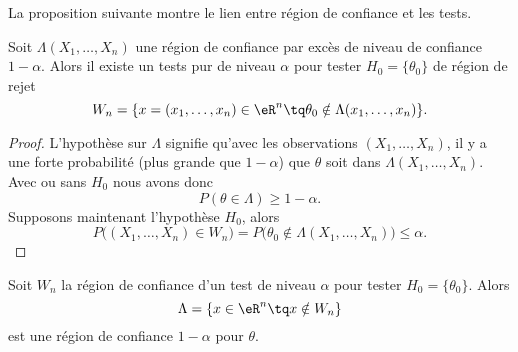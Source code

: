 La proposition suivante montre le lien entre région de confiance et les tests.
\begin{proposition}
    Soit \( \Lambda(X_1,\ldots, X_n)\) une région de confiance par excès de niveau de confiance \( 1-\alpha\). Alors il existe un tests pur de niveau \( \alpha\) pour tester \( H_0=\{ \theta_0 \}\) de région de rejet
    \begin{equation}
        W_n=\{ x=(x_1,\ldots,x_n)\in \eR^n\tq \theta_0\notin\Lambda(x_1,\ldots,x_n) \}.
    \end{equation}
\end{proposition}

\begin{proof}
    L'hypothèse sur \( \Lambda\) signifie qu'avec les observations \( (X_1,\ldots, X_n)\), il y a une forte probabilité (plus grande que \( 1-\alpha\)) que \( \theta\) soit dans \( \Lambda(X_1,\ldots, X_n)\). Avec ou sans \( H_0\) nous avons donc
    \begin{equation}
        P(\theta\in\Lambda)\geq 1-\alpha.
    \end{equation}
    Supposons maintenant l'hypothèse \( H_0\), alors
    \begin{equation}
        P\big( (X_1,\ldots, X_n)\in W_n \big)=P\big( \theta_0\notin\Lambda(X_1,\ldots, X_n) \big)\leq \alpha.
    \end{equation}
\end{proof}

\begin{remark}
    Soit \( W_n\) la région de confiance d'un test de niveau \( \alpha\) pour tester \( H_0=\{ \theta_0 \}\). Alors
    \begin{equation}
        \Lambda=\{ x\in\eR^n\tq x\notin W_n \}
    \end{equation}
    est une région de confiance \( 1-\alpha\) pour \( \theta\).
\end{remark}


